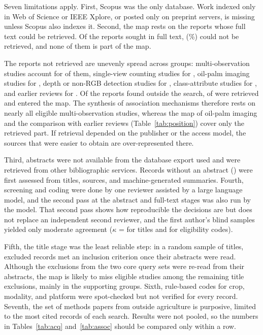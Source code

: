 Seven limitations apply. First, Scopus was the only database. Work indexed only in Web of Science or IEEE Xplore, or posted only on preprint servers, is missing unless Scopus also indexes it. Second, the map rests on the reports whose full text could be retrieved. Of the \nSought reports sought in full text, \nNotRetrieved (\pNotRetrieved\%) could not be retrieved, and none of them is part of the map.

The reports not retrieved are unevenly spread across groups: multi-observation studies account for \nNotRetrievedMulti of them, single-view counting studies for \nNotRetrievedSingle, oil-palm imaging studies for \nNotRetrievedPalm, depth or non-RGB detection studies for \nNotRetrievedDepth, class-attribute studies for \nNotRetrievedClass, and earlier reviews for \nNotRetrievedReview. Of the reports found outside the search, \nOtherRetrieved of \nOther were retrieved and entered the map. The synthesis of association mechanisms therefore rests on nearly all eligible multi-observation studies, whereas the map of oil-palm imaging and the comparison with earlier reviews (Table~\ref{tab:position}) cover only the retrieved part. If retrieval depended on the publisher or the access model, the sources that were easier to obtain are over-represented there.

Third, abstracts were not available from the database export used and were retrieved from other bibliographic services. Records without an abstract (\nNoAbstract) were first assessed from titles, sources, and machine-generated summaries. Fourth, screening and coding were done by one reviewer assisted by a large language model, and the second pass at the abstract and full-text stages was also run by the model. That second pass shows how reproducible the decisions are but does not replace an independent second reviewer, and the first author's blind samples yielded only moderate agreement ($\kappa$ = \kHumTitles for titles and \kHumElig for eligibility codes).

Fifth, the title stage was the least reliable step: in a random sample of \nSampleTitles titles, \nSampleTitlesEligible excluded records met an inclusion criterion once their abstracts were read. Although the exclusions from the two core query sets were re-read from their abstracts, the map is likely to miss eligible studies among the remaining title exclusions, mainly in the supporting groups. Sixth, rule-based codes for crop, modality, and platform were spot-checked but not verified for every record. Seventh, the set of methods papers from outside agriculture is purposive, limited to the most cited records of each search. Results were not pooled, so the numbers in Tables~\ref{tab:acq} and~\ref{tab:assoc} should be compared only within a row.

